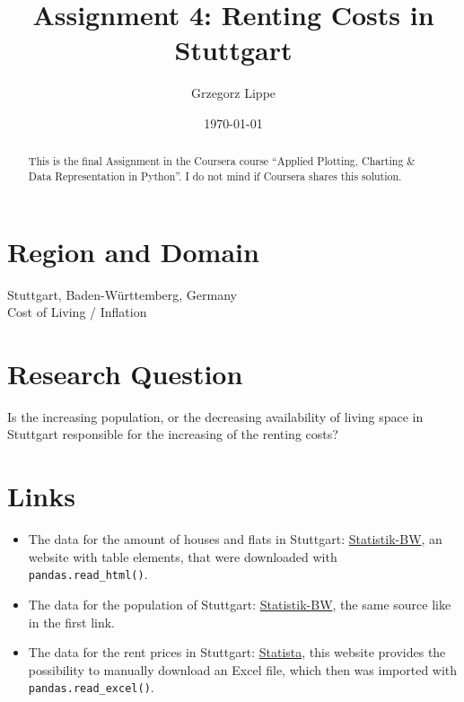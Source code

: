 \documentclass[parskip]{scrartcl}
\title{Assignment 4: Renting Costs in Stuttgart}
\author{Grzegorz Lippe}
\date{\today}
\begin{document}
\maketitle

\begin{abstract}
    This is the final Assignment in the Coursera course ``Applied Plotting,
    Charting \& Data Representation in Python''. I do not mind if Coursera
    shares this solution.
\end{abstract}

\section{Region and Domain}

Stuttgart, Baden-W\"urttemberg, Germany\\
Cost of Living / Inflation

\section{Research Question}

Is the increasing population, or the decreasing availability of living space in
Stuttgart responsible for the increasing of the renting costs?

\section{Links}

\begin{itemize}
    \item The data for the amount of houses and flats in Stuttgart:
    \href{https://www.statistik-bw.de/Wohnen/WkostenVerhaeltnis/99045041.tab?R=KR111}{Statistik-BW},
    an website with table elements, that were downloaded with \texttt{pandas.read\_html()}.
    \item The data for the population of Stuttgart:
    \href{https://www.statistik-bw.de/BevoelkGebiet/Bevoelkerung/01515020.tab?R=KR111}{Statistik-BW},
    the same source like in the first link.
    \item The data for the rent prices in Stuttgart:
    \href{https://de.statista.com/statistik/daten/studie/535218/umfrage/mietpreise-auf-dem-wohnungsmarkt-in-stuttgart}{Statista},
    this website provides the possibility to manually download an Excel file,
    which then was imported with \texttt{pandas.read\_excel()}.
\end{itemize}
\end{document}
